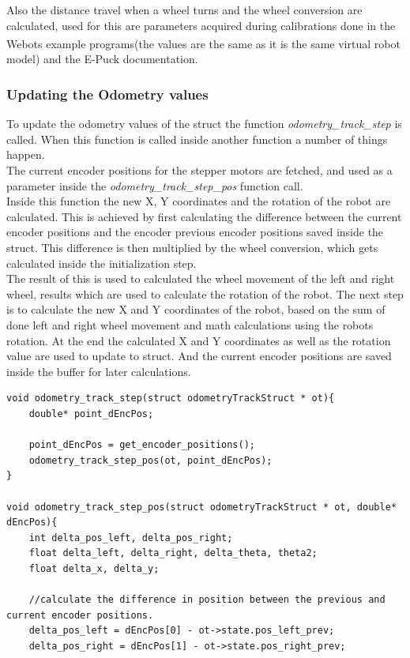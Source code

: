 \documentclass[10pt,a4paper]{article}
\begin{document}
\begin{flushleft}
Also the distance travel when a wheel turns and the wheel conversion are calculated, used for this are parameters acquired during calibrations done in the Webots \textsuperscript{\texttrademark} example programs(the values are the same as it is the same virtual robot model) and the E-Puck documentation. 

\subsubsection{Updating the Odometry values}
To update the odometry values of the struct the function \textit{odometry\_track\_step} is called.
When this function is called inside another function a number of things happen.\\
The current encoder positions for the stepper motors are fetched, 
and used as a parameter inside the \textit{odometry\_track\_step\_pos} function call. \\
Inside this function the new X, Y coordinates and the rotation of the robot are calculated. This is achieved by first calculating the difference between the current encoder positions and the encoder previous encoder positions saved inside the struct. 
This difference is then multiplied by the wheel conversion, which gets calculated inside the initialization step. \\
The result of this is used to calculated the wheel movement of the left and right wheel, results which are used to calculate the rotation of the robot. 
The next step is to calculate the new X and Y coordinates of the robot, based on the sum of done left and right wheel movement  and math calculations using the robots rotation. 
At the end the calculated X and Y coordinates as well as the rotation value are used to update to struct. And the current encoder positions are saved inside the buffer for later calculations. 

\begin{lstlisting}
void odometry_track_step(struct odometryTrackStruct * ot){
	double* point_dEncPos;
	
	point_dEncPos = get_encoder_positions();
	odometry_track_step_pos(ot,	point_dEncPos);
}

void odometry_track_step_pos(struct odometryTrackStruct * ot, double* dEncPos){
	int delta_pos_left, delta_pos_right;
	float delta_left, delta_right, delta_theta, theta2;
	float delta_x, delta_y;
	
	//calculate the difference in position between the previous and current encoder positions. 
	delta_pos_left = dEncPos[0] - ot->state.pos_left_prev;
	delta_pos_right = dEncPos[1] - ot->state.pos_right_prev;
	

\end{lstlisting}
\end{flushleft}
\end{document}
